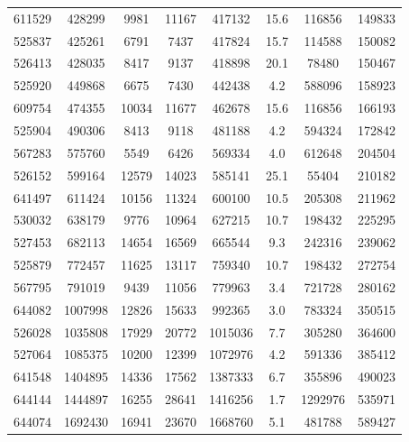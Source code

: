 \documentclass[DM,lsstdraft,toc,usenatbib]{lsstdoc}
\begin{document}
\begin{table}
\begin{tabular}{cccccccc}
611529 & 428299 & 9981 & 11167 & 417132 & 15.6 & 116856 & 149833 \\
525837 & 425261 & 6791 & 7437 & 417824 & 15.7 & 114588 & 150082 \\
526413 & 428035 & 8417 & 9137 & 418898 & 20.1 & 78480 & 150467 \\
525920 & 449868 & 6675 & 7430 & 442438 & 4.2 & 588096 & 158923 \\
609754 & 474355 & 10034 & 11677 & 462678 & 15.6 & 116856 & 166193 \\
525904 & 490306 & 8413 & 9118 & 481188 & 4.2 & 594324 & 172842 \\
567283 & 575760 & 5549 & 6426 & 569334 & 4.0 & 612648 & 204504 \\
526152 & 599164 & 12579 & 14023 & 585141 & 25.1 & 55404 & 210182 \\
641497 & 611424 & 10156 & 11324 & 600100 & 10.5 & 205308 & 211962 \\
530032 & 638179 & 9776 & 10964 & 627215 & 10.7 & 198432 & 225295 \\
527453 & 682113 & 14654 & 16569 & 665544 & 9.3 & 242316 & 239062 \\
525879 & 772457 & 11625 & 13117 & 759340 & 10.7 & 198432 & 272754 \\
567795 & 791019 & 9439 & 11056 & 779963 & 3.4 & 721728 & 280162 \\
644082 & 1007998 & 12826 & 15633 & 992365 & 3.0 & 783324 & 350515 \\
526028 & 1035808 & 17929 & 20772 & 1015036 & 7.7 & 305280 & 364600 \\
527064 & 1085375 & 10200 & 12399 & 1072976 & 4.2 & 591336 & 385412 \\
641548 & 1404895 & 14336 & 17562 & 1387333 & 6.7 & 355896 & 490023 \\
644144 & 1444897 & 16255 & 28641 & 1416256 & 1.7 & 1292976 & 535971 \\
644074 & 1692430 & 16941 & 23670 & 1668760 & 5.1 & 481788 & 589427 \\
\hline
\end{tabular}
\end{table}
\end{document}
